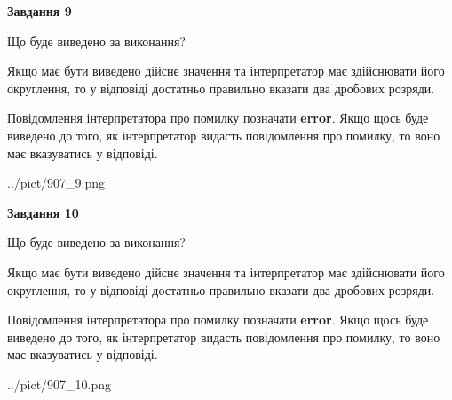 \documentclass[12pt, ukrainian]{article}
\begin{document}
{\begin {Large}
{\begin {center}\textbf{Завдання 9}\end {center}}\par
Що буде виведено за виконання? \par

Якщо має бути виведено дійсне значення та інтерпретатор має здійснювати його округлення, 
то у відповіді достатньо правильно вказати два дробових розряди.

Повідомлення інтерпретатора про помилку позначати \textbf{error}.
Якщо щось буде виведено до того, як інтерпретатор видасть повідомлення про помилку, 
то воно має вказуватись у відповіді. \par

\begin{center}
	{../pict/907_9.png}
\end{center}
\newpage

{\begin {center}\textbf{Завдання 10}\end {center}}\par
Що буде виведено за виконання? \par

Якщо має бути виведено дійсне значення та інтерпретатор має здійснювати його округлення, 
то у відповіді достатньо правильно вказати два дробових розряди.

Повідомлення інтерпретатора про помилку позначати \textbf{error}.
Якщо щось буде виведено до того, як інтерпретатор видасть повідомлення про помилку, 
то воно має вказуватись у відповіді. \par

\begin{center}
	{../pict/907_10.png}
\end{center}
\newpage

\end {Large}}
\end{document}
